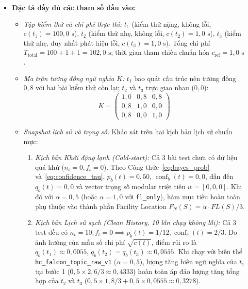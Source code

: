\begin{itemize}
    \item \textbf{Đặc tả đầy đủ các tham số đầu vào:}
    \begin{itemize}
        \item \textit{Tập kiểm thử và chi phí thực thi:} $t_1$ (kiểm thử nặng, không lỗi, $c(t_1) = 100{,}0\text{ s}$), $t_2$ (kiểm thử nhẹ, không lỗi, $c(t_2) = 1{,}0\text{ s}$), $t_3$ (kiểm thử nhẹ, duy nhất phát hiện lỗi, $c(t_3) = 1{,}0\text{ s}$). Tổng chi phí $T_{\text{total}} = 100 + 1 + 1 = 102{,}0\text{ s}$; thời gian tham chiếu chuẩn hóa $c_{\text{ref}} = 1{,}0\text{ s}$.
        \item \textit{Ma trận tương đồng ngữ nghĩa $K$:} $t_1$ bao quát cấu trúc nên tương đồng $0{,}8$ với hai bài kiểm thử còn lại; $t_2$ và $t_3$ trực giao nhau ($0{,}0$):
        \begin{equation}
        K = \begin{pmatrix}
        1{,}0 & 0{,}8 & 0{,}8 \\
        0{,}8 & 1{,}0 & 0{,}0 \\
        0{,}8 & 0{,}0 & 1{,}0
        \end{pmatrix}
        \end{equation}
        \item \textit{Snapshot lịch sử và trọng số:} Khảo sát trên hai kịch bản lịch sử chuẩn mực:
        \begin{enumerate}
            \item \textit{Kịch bản Khởi động lạnh (Cold-start):} Cả 3 bài test chưa có dữ liệu quá khứ ($n_t = 0, f_t = 0$). Theo Công thức~\eqref{eq:bayes_prob} và~\eqref{eq:confidence_tau}, $p_b(t) = 0{,}50$, $\operatorname{conf}_b(t) = 0{,}0$, dẫn đến $q_b(t) = 0{,}0$ và vector trọng số modular triệt tiêu $w = [0, 0, 0]$. Khi đó với $\alpha = 0{,}5$ (hoặc $\alpha = 1{,}0$ với \texttt{fl\_only}), hàm mục tiêu hoàn toàn phụ thuộc vào thành phần Facility Location $F_N(S) = \alpha \cdot FL(S) / 3$.
            \item \textit{Kịch bản Lịch sử sạch (Clean History, 10 lần chạy không lỗi):} Cả 3 test đều có $n_t = 10, f_t = 0 \implies p_b(t) = 1/12, \operatorname{conf}_b(t) = 2/3$. Do ảnh hưởng của mẫu số chi phí $\sqrt{c(t)}$, điểm rủi ro là $q_b(t_1) \approx 0{,}0055$, $q_b(t_2) = q_b(t_3) \approx 0{,}0555$. Khi chạy với biến thể \texttt{hc\_falcon\_topic\_raw\_v1} ($\alpha = 0{,}5$), lượng tăng biên ngữ nghĩa của $t_1$ tại bước 1 ($0{,}5 \times 2{,}6 / 3 \approx 0{,}4333$) hoàn toàn áp đảo lượng tăng tổng hợp của $t_2$ và $t_3$ ($0{,}5 \times 1{,}8 / 3 + 0{,}5 \times 0{,}0555 \approx 0{,}3278$).
        \end{enumerate}
    \end{itemize}
\end{itemize}

